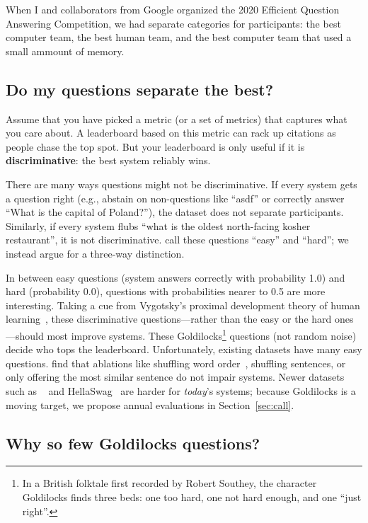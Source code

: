 When I and collaborators from Google organized the 2020 Efficient Question Answering Competition, we had separate categories for participants: the best computer team, the best human team, and the best computer team that used a small ammount of memory.

\subsection{Do my questions separate the best?}
\label{sec:discriminative}

Assume that you have picked a metric (or a set of metrics) that captures what you care about.
A leaderboard based on this metric can rack up citations as people chase the top spot.
But your leaderboard is only useful if it is {\bf discriminative}: the best system reliably wins.

There are many ways questions might not be discriminative.
If every system gets a question right (e.g., abstain on non-questions like ``asdf'' or correctly answer ``What is the capital of Poland?''), the dataset does not separate participants.
Similarly, if every system flubs ``what is the oldest north-facing kosher restaurant'', it is not discriminative.
 call these questions ``easy'' and ``hard''; we instead argue for a three-way distinction.

In between easy questions (system answers correctly with probability 1.0) and hard (probability 0.0), questions with probabilities nearer to 0.5 are more interesting.
Taking a cue from Vygotsky's proximal development theory of human learning~\cite{chaiklin-03}, these discriminative questions---rather than the easy or the hard ones---should most improve  systems.
These Goldilocks\footnote{In a British folktale first recorded by Robert Southey, the character Goldilocks finds three beds: one too hard, one not hard enough, and one ``just right''.} questions (not random noise) decide who tops the leaderboard.
Unfortunately, existing datasets have many easy questions.
 find that ablations like shuffling word order~\cite{feng-18}, shuffling sentences, or only offering the most similar sentence do not impair systems.
Newer datasets such as ~\cite{dua-19} and HellaSwag~\cite{zellers-19} are harder for \emph{today}'s systems; because Goldilocks is a moving target, we propose annual evaluations in Section~\ref{sec:call}.

\subsection{Why so few Goldilocks questions?}

